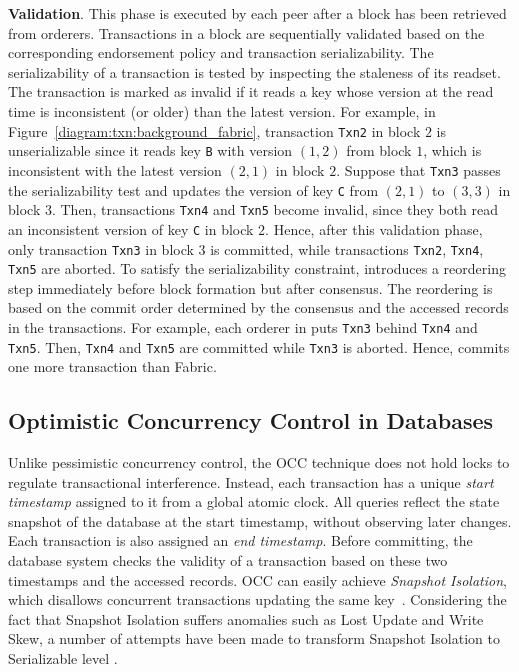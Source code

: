 \textbf{Validation}. This phase is executed by each peer after
  a block has been retrieved from orderers.
  Transactions in a block are sequentially validated based on the
  corresponding endorsement policy and transaction serializability.
  The serializability of a transaction is tested by inspecting the
  staleness of its readset. The transaction is marked as invalid if it
  reads a key whose version at the read time is inconsistent (or older) than the
  latest version.
  For example, in Figure~\ref{diagram:txn:background_fabric}, transaction \texttt{Txn2} in
  block $2$ is unserializable since it reads key \texttt{B} with version
  $(1,2)$ from block $1$, which is inconsistent with the latest version $(2,1)$
  in block $2$.
  Suppose that \texttt{Txn3} passes the serializability test and updates the version of key \texttt{C} from $(2,1)$ to $(3,3)$ in block $3$. Then, transactions \texttt{Txn4} and \texttt{Txn5} become invalid, since they both read an inconsistent version of key \texttt{C} in block $2$.
  Hence, after this validation phase, only transaction \texttt{Txn3} in
  block $3$ is committed, while transactions \texttt{Txn2}, \texttt{Txn4}, \texttt{Txn5} are aborted.
  To satisfy the serializability constraint, {\fabricPlusplus} introduces a reordering step immediately before block formation but after consensus.
  The reordering is based on the commit order determined by the consensus and the accessed records in the transactions. 
  For example, each orderer in {\fabricPlusplus} puts \texttt{Txn3} behind \texttt{Txn4} and  \texttt{Txn5}. Then, \texttt{Txn4} and \texttt{Txn5} are committed while \texttt{Txn3} is aborted. 
  Hence, {\fabricPlusplus} commits one more transaction than Fabric. 
  
\subsection{Optimistic Concurrency Control in Databases}
Unlike pessimistic concurrency control, the OCC technique does not hold locks to
regulate transactional interference.
%
Instead, each transaction has a unique \textit{start timestamp} assigned to it
from a global atomic clock.
%
All queries reflect the state snapshot of the database at the start timestamp,
without observing later changes.
%
Each transaction is also assigned an {\textit{end timestamp}}. 
%
Before committing, the database system checks the validity of a transaction
based on these two timestamps and the accessed records.
%
OCC can easily achieve \textit{Snapshot Isolation}, which disallows concurrent
transactions updating the same key~\cite{berenson1995critique}.
%
Considering the fact that Snapshot Isolation suffers anomalies such as
Lost Update and Write Skew, a number of attempts have been
made to transform Snapshot Isolation to Serializable level
\cite{fekete2005making, yabandeh2012critique, bornea2011one}.

